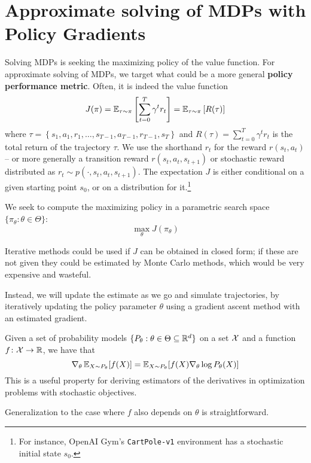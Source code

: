 \documentclass[../course-notes.tex]{subfiles}
\begin{document}
\chapter{Approximate solving of MDPs with Policy Gradients}


Solving MDPs is seeking the maximizing policy of the value function. For approximate solving of MDPs, we target what could be a more general \textbf{\bluefont policy performance metric}. Often, it is indeed the value function
\begin{equation}\label{eq:PolicyPerfCumReward}
J(\pi) = \operatorname{\mathbb{E}}_{\tau\sim\pi}\left[
\sum_{t=0}^{T} \gamma^t r_t
\right] =
\operatorname{\mathbb{E}}_{\tau\sim\pi}
\left[R(\tau)\right]
\end{equation}
where $\tau = \left\{ s_1,a_1,r_1,\ldots,s_{T-1},a_{T-1},r_{T-1},s_{T}\right\}$ and $R(\tau) = \sum_{t=0}^T \gamma^t r_t$ is the total return of the trajectory $\tau$.
We use the shorthand $r_t$ for the reward $r(s_t, a_t)$ -- or more generally a transition reward $r(s_t, a_t, s_{t+1})$ or stochastic reward distributed as $r_t \sim p(\cdot, s_t, a_t, s_{t+1})$. The expectation $J$ is either conditional on a given starting point $s_0$, or on a distribution for it.\footnote{For instance, OpenAI Gym's \texttt{CartPole-v1} environment has a stochastic initial state $s_0$.}

We seek to compute the maximizing policy in a parametric search space $\{\pi_\theta: \theta\in\Theta\}$:
\[
\max_\theta J(\pi_\theta)
\]

Iterative methods could be used if $J$ can be obtained in closed form; if these are not given they could be estimated by Monte Carlo methods, which would be very expensive and wasteful.

Instead, we will update the estimate as we go and simulate trajectories, by iteratively updating the policy parameter $\theta$ using a gradient ascent method with an estimated gradient.

\begin{prop}\label{prop:parametricGradient}
	Given a set of probability models $\{P_\theta: \theta\in\Theta\subseteq \mathbb{R}^d\}$ on a set $\mathcal{X}$ and a function $f\colon \mathcal{X}\to \mathbb{R}$, we have that
	\[
	\nabla_\theta \operatorname{\mathbb{E}}_{X\sim P_\theta}[f(X)]
	= \operatorname{\mathbb{E}}_{X\sim P_\theta}[f(X)\nabla_\theta \log P_\theta(X)]
	\]
	This is a useful property for deriving estimators of the derivatives in optimization problems with stochastic objectives.
	
	Generalization to the case where $f$ also depends on $\theta$ is straightforward.
\end{prop}
\end{document}
